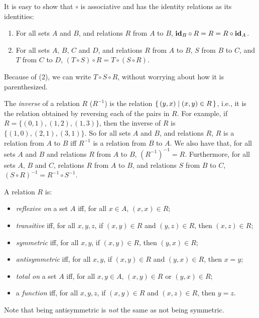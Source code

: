 It is easy to show that $\circ$ is associative
%
%
%
%
and has the identity relations as its identities:
\begin{enumerate}[\quad(1)]
\item For all sets $A$ and $B$, and relations $R$ from $A$ to $B$,
$\mathbf{id}_B\circ R = R = R\circ\mathbf{id}_A$.

\item For all sets $A$, $B$, $C$ and $D$, and relations
$R$ from $A$ to $B$, $S$ from $B$ to $C$, and $T$ from $C$ to $D$,
$(T\circ S)\circ R = T\circ (S\circ R)$.
\end{enumerate}
Because of (2), we can write $T\circ S\circ R$, without worrying about
how it is parenthesized.

The \emph{inverse}
%
of a relation $R$ ($R^{-1}$) is the relation
$\{ \, (y, x) \mid (x, y)\in R \, \}$, i.e., it is the relation obtained by
reversing each of the pairs in $R$.  For example, if
$R=\{(0, 1), (1, 2), (1, 3)\}$, then the inverse of $R$ is
$\{(1, 0), (2, 1), (3, 1)\}$.  So for all sets $A$ and $B$, and
relations $R$, $R$ is a relation from $A$ to $B$ iff $R^{-1}$ is a
relation from $B$ to $A$. We also have that, for all sets $A$ and $B$
and relations $R$ from $A$ to $B$, $(R^{-1})^{-1} = R$. Furthermore,
for all sets $A$, $B$ and $C$, relations $R$ from $A$ to $B$, and
relations $S$ from $B$ to $C$, $(S\circ R)^{-1} = R^{-1}\circ S^{-1}$.

A relation $R$ is:
\begin{itemize}
\item \emph{reflexive on}
%
%
a set $A$ iff, for all $x\in A$, $(x,x)\in R$;

\item \emph{transitive}
%
%
iff, for all $x,y,z$, if $(x,y)\in R$ and
$(y,z)\in R$, then $(x, z)\in R$;

\item \emph{symmetric}
%
%
iff, for all $x,y$, if $(x,y)\in R$, then $(y, x)\in R$;

\item \emph{antisymmetric}
%
%
iff, for all $x,y$, if $(x,y)\in R$ and $(y,x)\in R$, then $x=y$;

\item \emph{total on}
%
%
a set $A$ iff, for all $x,y\in A$, $(x,y)\in R$ or $(y,x)\in R$;

\item a \emph{function}
%
%
iff, for all $x,y,z$, if $(x,y)\in R$ and $(x, z)\in R$, then $y=z$.
\end{itemize}
Note that being antisymmetric is \emph{not} the same as not being symmetric.

